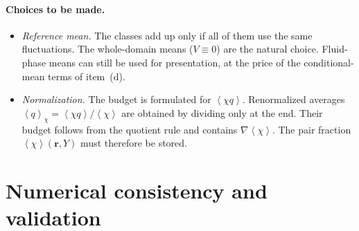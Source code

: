 \documentclass[11pt,a4paper]{article}
\newcommand{\avg}[1]{\left\langle #1 \right\rangle}
\newcommand{\vect}[1]{\boldsymbol{#1}}
\begin{document}
\paragraph{Choices to be made.}
\begin{itemize}[itemsep=1pt]
\item \emph{Reference mean.} The classes add up only if all of them use the
  same fluctuations. The whole-domain means ($V\equiv0$) are the natural
  choice. Fluid-phase means can still be used for presentation, at the price
  of the conditional-mean terms of item~(d).
\item \emph{Normalization.} The budget is formulated for $\avg{\chi q}$.
  Renormalized averages $\avg{q}_\chi=\avg{\chi q}/\avg{\chi}$ are obtained
  by dividing only at the end. Their budget follows from the quotient rule
  and contains $\nabla\avg{\chi}$. The pair fraction $\avg{\chi}(\vect r,Y)$
  must therefore be stored.
\end{itemize}

\section{Numerical consistency and validation}
\label{sec:validation}
\end{document}
